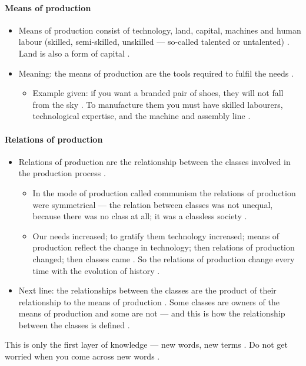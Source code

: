 \paragraph{Means of production}
\begin{itemize}
    \item Means of production consist of technology, land, capital, machines and human labour (skilled, semi-skilled, unskilled --- so-called talented or untalented) . Land is also a form of capital .
    \item Meaning: the means of production are the tools required to fulfil the needs .
    \begin{itemize}
        \item Example given: if you want a branded pair of shoes, they will not fall from the sky . To manufacture them you must have skilled labourers, technological expertise, and the machine and assembly line .
    \end{itemize}
\end{itemize}

\paragraph{Relations of production}
\begin{itemize}
    \item Relations of production are the relationship between the classes involved in the production process .
    \begin{itemize}
        \item In the mode of production called communism the relations of production were symmetrical --- the relation between classes was not unequal, because there was no class at all; it was a classless society .
        \item Our needs increased; to gratify them technology increased; means of production reflect the change in technology; then relations of production changed; then classes came . So the relations of production change every time with the evolution of history .
    \end{itemize}
    \item Next line: the relationships between the classes are the product of their relationship to the means of production . Some classes are owners of the means of production and some are not --- and this is how the relationship between the classes is defined .
\end{itemize}

\begin{CriticalPoint}
This is only the first layer of knowledge --- new words, new terms . Do not get worried when you come across new words .
\end{CriticalPoint}

